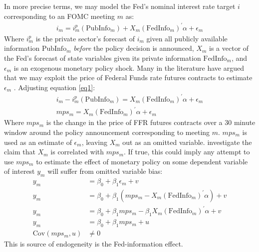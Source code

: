 \documentclass[a4paper,man,floatsintext,natbib]{apa6}
\begin{document}
	In more precise terms, we may model the Fed's nominal interest rate target \(i\) corresponding to an FOMC meeting \(m\) as:
	\begin{align}
		i_m = i_m^p(\text{PubInfo}_m) + X_m(\text{FedInfo}_m)^\prime \alpha + \epsilon_m \label{eq1}
	\end{align}
	Where \(i_m^p\) is the private sector's forecast of \(i_m\) given all publicly available information \(\text{PubInfo}_m\) \textit{before} the policy decision is announced, \(X_m\) is a vector of the Fed's forecast of state variables given its private information \(\text{FedInfo}_m\), and \(\epsilon_m\) is an exogenous monetary policy shock. Many in the literature have argued that we may exploit the price of Federal Funds rate futures contracts to estimate \(\epsilon_m\) \citep{Gurkaynak2011,Gertler2015, Nakamura2018}. Adjusting equation \ref{eq1}:
	\begin{align*}
		i_m - i_m^p(\text{PubInfo}_m) = X_m(\text{FedInfo}_m)^\prime \alpha + \epsilon_m \\
		mps_m = X_m(\text{FedInfo}_m)^\prime \alpha + \epsilon_m \tag{2} \label{model}
	\end{align*}
	Where \(mps_m\) is the change in the price of FFR futures contracts over a 30 minute window around the policy announcement corresponding to meeting \(m\). \(mps_m\) is used as an estimate of \(\epsilon_m\), leaving \(X_m\) out as an omitted variable. \cite{Bauer2020} investigate the claim that \(X_m\) is correlated with \(mps_m\). If true, this could imply any attempt to use \(mps_m\) to estimate the effect of monetary policy on some dependent variable of interest \(y_m\) will suffer from omitted variable bias:
	\begin{align*}
		y_m &= \beta_0 + \beta_1 \epsilon_m  + v \\
		y_m &= \beta_0 + \beta_1(mps_m - X_m(\text{FedInfo}_m)^\prime \alpha )  + v \\
		y_m &= \beta_0 + \beta_1mps_m - \beta_1 X_m(\text{FedInfo}_m)^\prime \alpha + v \\
		y_m &= \beta_0 + \beta_1mps_m + u \tag{3} \label{eq3} \\ 
		\mathrm{Cov}(mps_m, u) &\neq 0 
	\end{align*}
	This is source of endogeneity is the Fed-information effect.
\end{document}
